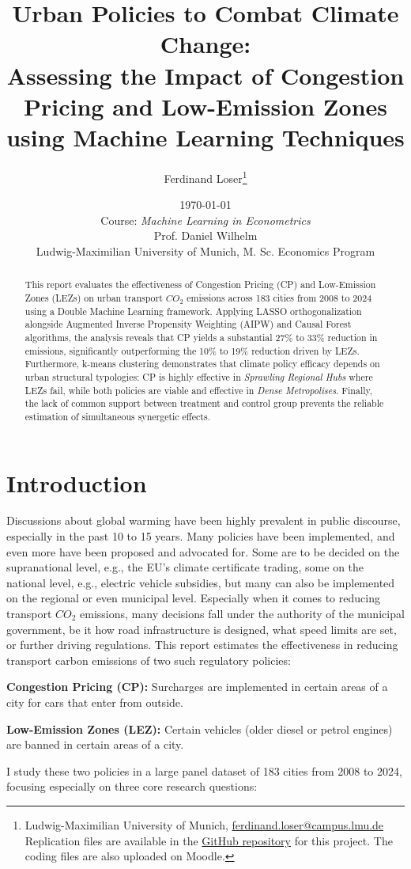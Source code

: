 \documentclass[12pt, a4paper]{article}
\title{Urban Policies to Combat Climate Change: \\ Assessing the Impact of Congestion Pricing and Low-Emission Zones using Machine Learning Techniques}
\author{
    Ferdinand Loser\thanks{Ludwig-Maximilian University of Munich, \href{mailto:ferdinand.loser@campus.lmu.de}{ferdinand.loser@campus.lmu.de} \\ Replication files are available in the \href{https://github.com/FerdinandLos/machine-learning-policy}{GitHub repository} for this project. The coding files are also uploaded on Moodle.}
}
\date{\today \\ \vspace{0.5cm} Course: \textit{Machine Learning in Econometrics} \\ Prof. Daniel Wilhelm \\ \vspace{0.5cm} Ludwig-Maximilian University of Munich, M. Sc. Economics Program}
\begin{document}
\maketitle
\thispagestyle{empty}

\begin{abstract}
\noindent
This report evaluates the effectiveness of Congestion Pricing (CP) and Low-Emission Zones (LEZs) on urban transport $CO_2$ emissions across 183 cities from 2008 to 2024 using a Double Machine Learning framework. Applying LASSO orthogonalization alongside Augmented Inverse Propensity Weighting (AIPW) and Causal Forest algorithms, the analysis reveals that CP yields a substantial 27\% to 33\% reduction in emissions, significantly outperforming the 10\% to 19\% reduction driven by LEZs. Furthermore, k-means clustering demonstrates that climate policy efficacy depends on urban structural typologies: CP is highly effective in \textit{Sprawling Regional Hubs} where LEZs fail, while both policies are viable and effective in \textit{Dense Metropolises}. Finally, the lack of common support between treatment and control group prevents the reliable estimation of simultaneous synergetic effects.
\end{abstract}

\clearpage %

\section{Introduction}

\label{sec:introduction}

Discussions about global warming have been highly prevalent in public discourse, especially in the past 10 to 15 years. Many policies have been implemented, and even more have been proposed and advocated for. Some are to be decided on the supranational level, e.g., the EU's climate certificate trading, some on the national level, e.g., electric vehicle subsidies, but many can also be implemented on the regional or even municipal level. Especially when it comes to reducing transport $CO_2$ emissions, many decisions fall under the authority of the municipal government, be it how road infrastructure is designed, what speed limits are set, or further driving regulations. This report estimates the effectiveness in reducing transport carbon emissions of two such regulatory policies:

\begin{definition}
\textbf{Congestion Pricing (CP): } Surcharges are implemented in certain areas of a city for cars that enter from outside.
\end{definition}
\begin{definition}
\textbf{Low-Emission Zones (LEZ): } Certain vehicles (older diesel or petrol engines) are banned in certain areas of a city.
\end{definition}
I study these two policies in a large panel dataset of 183 cities from 2008 to 2024, focusing especially on three core research questions:
\end{document}
